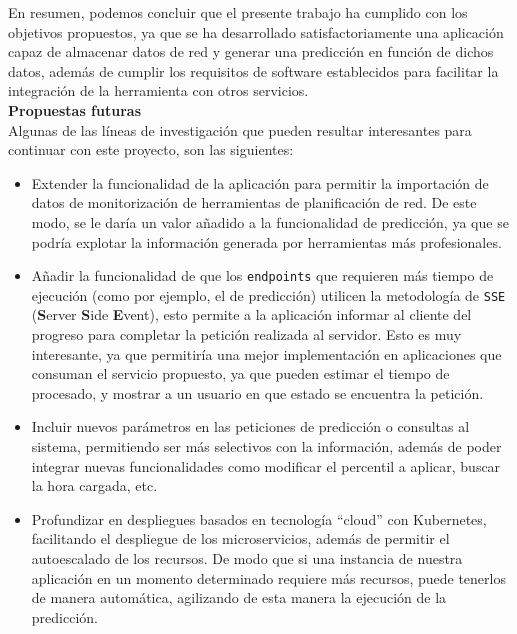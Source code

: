 \documentclass[a4paper, oneside, 12pt]{book}
\begin{document}
	\pagebreak
	
	\noindent En resumen, podemos concluir que el presente trabajo ha cumplido con los objetivos propuestos, ya que se ha desarrollado satisfactoriamente una aplicación capaz de almacenar datos de red y generar una predicción en función de dichos datos, además de cumplir los requisitos de software establecidos para facilitar la integración de la herramienta con otros servicios. \\
	
	
	\noindent \textbf{\large Propuestas futuras} \\
	
	\noindent Algunas de las líneas de investigación que pueden resultar interesantes para continuar con este proyecto, son las siguientes:
	
	\begin{itemize}
		\item Extender la funcionalidad de la aplicación para permitir la importación de datos de monitorización de herramientas de planificación de red. De este modo, se le daría un valor añadido a la funcionalidad de predicción, ya que se podría explotar la información generada por herramientas más profesionales.
		
		\item Añadir la funcionalidad de que los \texttt{endpoints} que requieren más tiempo de ejecución (como por ejemplo, el de predicción) utilicen la metodología de \texttt{SSE} (\textbf{S}erver \textbf{S}ide \textbf{E}vent), esto permite a la aplicación informar al cliente del progreso para completar la petición realizada al servidor. Esto es muy interesante, ya que permitiría una mejor implementación en aplicaciones que consuman el servicio propuesto, ya que pueden estimar el tiempo de procesado, y mostrar a un usuario en que estado se encuentra la petición.
		
		\item Incluir nuevos parámetros en las peticiones de predicción o consultas al sistema, permitiendo ser más selectivos con la información, además de poder integrar nuevas funcionalidades como modificar el percentil a aplicar, buscar la hora cargada, etc. 
		
		\item Profundizar en despliegues basados en tecnología ``cloud'' con Kubernetes, facilitando el despliegue de los microservicios, además de permitir el autoescalado de los recursos. De modo que si una instancia de nuestra aplicación en un momento determinado requiere más recursos, puede tenerlos de manera automática, agilizando de esta manera la ejecución de la predicción.
	\end{itemize}
	
\end{document}
